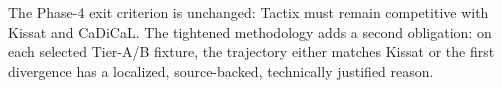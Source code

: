 \documentclass[11pt]{article}
\newcommand{\tactix}{Tactix}
\newcommand{\kissat}{Kissat}
\begin{document}
The Phase-4 exit criterion is unchanged: \tactix{} must remain competitive
with \kissat{} and CaDiCaL.  The tightened methodology adds a second obligation:
on each selected Tier-A/B fixture, the trajectory either matches \kissat{} or
the first divergence has a localized, source-backed, technically justified
reason.
\end{document}
